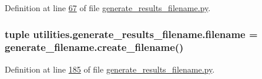 Definition at line \hyperlink{generate__results__filename_8py_source_l00067}{67} of file \hyperlink{generate__results__filename_8py_source}{generate\+\_\+results\+\_\+filename.\+py}.

\hypertarget{namespaceutilities_1_1generate__results__filename_a4ef8cf545152b32ed95983cba284b478}{}
\subsubsection[{filename}]{\setlength{\rightskip}{0pt plus 5cm}tuple utilities.\+generate\+\_\+results\+\_\+filename.\+filename = {\bf generate\+\_\+filename.\+create\+\_\+filename}()}\label{namespaceutilities_1_1generate__results__filename_a4ef8cf545152b32ed95983cba284b478}


Definition at line \hyperlink{generate__results__filename_8py_source_l00185}{185} of file \hyperlink{generate__results__filename_8py_source}{generate\+\_\+results\+\_\+filename.\+py}.


